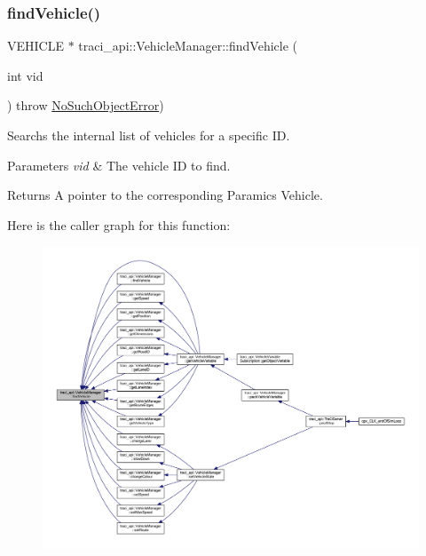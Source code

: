 \subsubsection{\texorpdfstring{find\+Vehicle()}{findVehicle()}\hspace{0.1cm}{\footnotesize\ttfamily [1/2]}}
{\footnotesize\ttfamily V\+E\+H\+I\+C\+LE $\ast$ traci\+\_\+api\+::\+Vehicle\+Manager\+::find\+Vehicle (\begin{DoxyParamCaption}\item[{int}]{vid }\end{DoxyParamCaption}) throw  \hyperlink{classtraci__api_1_1_no_such_object_error}{No\+Such\+Object\+Error}) }



Searchs the internal list of vehicles for a specific ID. 


\begin{DoxyParams}{Parameters}
{\em vid} & The vehicle ID to find. \\
\hline
\end{DoxyParams}
\begin{DoxyReturn}{Returns}
A pointer to the corresponding Paramics Vehicle. 
\end{DoxyReturn}
Here is the caller graph for this function\+:
\nopagebreak
\begin{figure}[H]
\begin{center}
\leavevmode
\includegraphics[width=350pt]{classtraci__api_1_1_vehicle_manager_a46fe50f2be4e9eb6df8f62b9a6e7aa53_icgraph}
\end{center}
\end{figure}
\mbox{\label{classtraci__api_1_1_vehicle_manager_a4fc72da33abd7a0323fd27c7721ba3ef}} 

